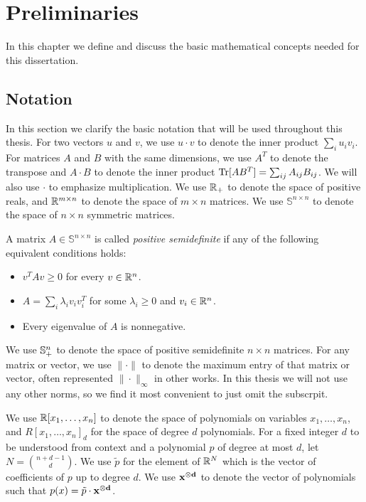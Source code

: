\chapter{Preliminaries}\label{cha:prelims}
In this chapter we define and discuss the basic mathematical concepts needed for this dissertation.

\section{Notation}
In this section we clarify the basic notation that will be used throughout this thesis. For two vectors $u$ and $v$, we use $u \cdot v$ to denote the inner product $\sum_i u_i v_i$. For matrices $A$ and $B$ with the same dimensions, we use $A^T$ to denote the transpose and $A \cdot B$ to denote the inner product $\operatorname{Tr}[AB^T] = \sum_{ij} A_{ij}B_{ij}$. We will also use $\cdot$ to emphasize multiplication. We use $\mathbb R_+$ to denote the space of positive reals, and $\mathbb R^{m \times n}$ to denote the space of $m \times n$ matrices. We use $\mathbb{S}^{n \times n}$ to denote the space of $n \times n$ symmetric matrices.
\begin{definition}
A matrix $A \in \mathbb{S}^{n \times n}$ is called \emph{positive semidefinite} if any of the following equivalent conditions holds:
\begin{itemize}
\item $v^TAv \geq 0$ for every $v \in \mathbb R^n$.
\item $A = \sum_i \lambda_i v_iv_i^T$ for some $\lambda_i \geq 0$ and $v_i \in \mathbb R^n$.
\item Every eigenvalue of $A$ is nonnegative.
\end{itemize}
\end{definition}
We use $\mathbb{S}^{n}_+$ to denote the space of positive semidefinite $n \times n$ matrices. For any matrix or vector, we use $\|\cdot\|$ to denote the maximum entry of that matrix or vector, often represented $\|\cdot\|_\infty$ in other works. In this thesis we will not use any other norms, so we find it most convenient to just omit the subscrpit.

We use $\mathbb R[x_1,\dots,x_n]$ to denote the space of polynomials on variables $x_1,\dots,x_n$, and $R[x_1,\dots,x_n]_d$ for the space of degree $d$ polynomials.
For a fixed integer $d$ to be understood from context and a polynomial $p$ of degree at most $d$, let $N = \binom{n+d-1}{d}$. We use $\tilde{p}$ for the element of $\mathbb R^{N}$ which is the vector of coefficients of $p$ up to degree $d$. We use $\mathbf{x^{\otimes d}}$ to denote the vector of polynomials such that $p(x) = \tilde{p} \cdot \mathbf{x^{\otimes d}}$.

